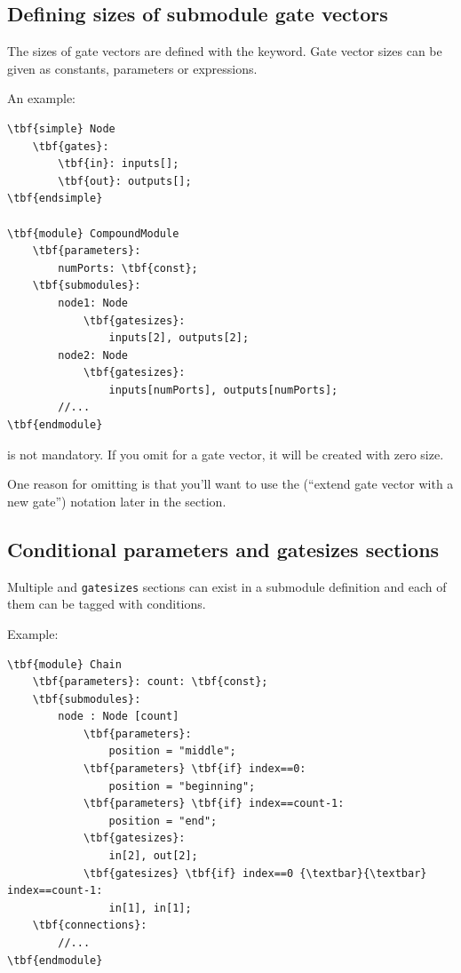 \subsection{Defining sizes of submodule gate vectors}


The sizes of gate vectors are defined with the
 keyword.  Gate vector sizes
can be given as constants, parameters or expressions.

An example:

\begin{Verbatim}[commandchars=\\\{\}]
\tbf{simple} Node
    \tbf{gates}:
        \tbf{in}: inputs[];
        \tbf{out}: outputs[];
\tbf{endsimple}

\tbf{module} CompoundModule
    \tbf{parameters}:
        numPorts: \tbf{const};
    \tbf{submodules}:
        node1: Node
            \tbf{gatesizes}:
                inputs[2], outputs[2];
        node2: Node
            \tbf{gatesizes}:
                inputs[numPorts], outputs[numPorts];
        //...
\tbf{endmodule}
\end{Verbatim}


 is not mandatory.
If you omit  for a gate vector, it will be created with zero size.

One reason for omitting  is that you'll want to use
the  (``extend gate vector with a new gate'') notation later in the
 section.



\subsection{Conditional parameters and gatesizes sections}


Multiple  and
\texttt{gatesizes} sections can exist in a submodule
definition and each of them can be tagged with
conditions.

Example:

\begin{Verbatim}[commandchars=\\\{\}]
\tbf{module} Chain
    \tbf{parameters}: count: \tbf{const};
    \tbf{submodules}:
        node : Node [count]
            \tbf{parameters}:
                position = "middle";
            \tbf{parameters} \tbf{if} index==0:
                position = "beginning";
            \tbf{parameters} \tbf{if} index==count-1:
                position = "end";
            \tbf{gatesizes}:
                in[2], out[2];
            \tbf{gatesizes} \tbf{if} index==0 {\textbar}{\textbar} index==count-1:
                in[1], in[1];
    \tbf{connections}:
        //...
\tbf{endmodule}
\end{Verbatim}

